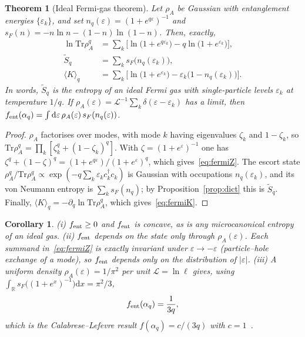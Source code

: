 \documentclass[11pt]{article}
\newtheorem{theorem}{Theorem}
\newtheorem{corollary}{Corollary}[section]
\theoremstyle{definition}\newtheorem{definition}{Definition}[section]
\theoremstyle{remark}\newtheorem*{remark}{Remark}
\newcommand{\dd}{\mathrm{d}}
\newcommand{\Tr}{\mathrm{Tr}}
\newcommand{\cL}{\mathcal{L}}
\begin{document}
\begin{theorem}[Ideal Fermi-gas theorem]
\label{thm:fermi}
Let $\rho_A$ be Gaussian with entanglement energies $\{\varepsilon_k\}$, and set $n_q(\varepsilon)=(1+e^{q\varepsilon})^{-1}$
and $s_F(n)=-n\ln n-(1-n)\ln(1-n)$. Then, exactly,
\begin{align}
\ln\Tr\rho_A^q&=\sum_k\Big[\ln\big(1+e^{q\varepsilon_k}\big)-q\ln\big(1+e^{\varepsilon_k}\big)\Big],\label{eq:fermiZ}\\
\tilde S_q&=\sum_k s_F\big(n_q(\varepsilon_k)\big),\label{eq:fermiS}\\
\langle K\rangle_q&=\sum_k\Big[\ln\big(1+e^{\varepsilon_k}\big)-\varepsilon_k\big(1-n_q(\varepsilon_k)\big)\Big].\label{eq:fermiK}
\end{align}
In words, $\tilde S_q$ is the entropy of an ideal Fermi gas with single-particle levels $\varepsilon_k$ at
temperature $1/q$. If $\rho_A(\varepsilon)=\cL^{-1}\sum_k\delta(\varepsilon-\varepsilon_k)$ has a limit, then
$f_{\rm ent}(\alpha_q)=\int\dd\varepsilon\,\rho_A(\varepsilon)\,s_F(n_q(\varepsilon))$.
\end{theorem}
\begin{proof}
$\rho_A$ factorises over modes, with mode $k$ having eigenvalues $\zeta_k$ and $1-\zeta_k$, so
$\Tr\rho_A^q=\prod_k[\zeta_k^q+(1-\zeta_k)^q]$. With $\zeta=(1+e^{\varepsilon})^{-1}$ one has
$\zeta^q+(1-\zeta)^q=(1+e^{q\varepsilon})/(1+e^{\varepsilon})^q$, which gives~\eqref{eq:fermiZ}. The escort state
$\rho_A^q/\Tr\rho_A^q\propto\exp(-q\sum_k\varepsilon_kc_k^\dagger c_k)$ is Gaussian with occupations
$n_q(\varepsilon_k)$, and its von Neumann entropy is $\sum_ks_F(n_q)$; by Proposition~\ref{prop:dict} this is
$\tilde S_q$. Finally, $\langle K\rangle_q=-\partial_q\ln\Tr\rho_A^q$, which gives~\eqref{eq:fermiK}.
\end{proof}

\begin{corollary}
\label{cor:fermi}
(i) $f_{\rm ent}\ge0$ and $f_{\rm ent}$ is concave, as is any microcanonical entropy of an ideal gas.
(ii) $f_{\rm ent}$ depends on the state only through $\rho_A(\varepsilon)$. Each summand
in~\eqref{eq:fermiZ} is exactly invariant under $\varepsilon\to-\varepsilon$ (particle--hole exchange of a mode), so
$f_{\rm ent}$ depends only on the distribution of $|\varepsilon|$.
(iii) A uniform density $\rho_A(\varepsilon)=1/\pi^2$ per unit $\cL=\ln\ell$ gives, using
$\int_{\mathbb R}s_F\big((1+e^x)^{-1}\big)\dd x=\pi^2/3$,
\begin{equation}
f_{\rm ent}(\alpha_q)=\frac{1}{3q},
\end{equation}
which is the Calabrese--Lefevre result $f(\alpha_q)=c/(3q)$ with $c=1$~\cite{CL}.
\end{corollary}
\end{document}
